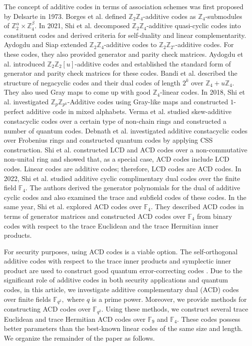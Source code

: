 \documentclass[sn-mathphys-num]{sn-jnl}%
\theoremstyle{thmstyleone}%
\theoremstyle{thmstyletwo}%
\theoremstyle{thmstylethree}%
\begin{document}
The concept of additive codes in terms of association schemes was first proposed by Delsarte \cite{fadditive,additivebook} in 1973. Borges et al. \cite{z2z4}
defined $\mathbb{Z}_2\mathbb{Z}_4$-additive codes as $\mathbb{Z}_4$-submodules of $\mathbb{Z}_2^{\alpha}\times \mathbb{Z}_4^{\beta}.$  In 2021, Shi et al. \cite{shi2021}  decomposed $\mathbb{Z}_2\mathbb{Z}_4$-additive quasi-cyclic codes   into constituent codes and derived criteria for self-duality and linear complementarity. Aydogdu and Siap \cite{z2z2sac} extended  $\mathbb{Z}_2\mathbb{Z}_4$-additive codes to $\mathbb{Z}_2 \mathbb{Z}_{2^s}$-additive codes. For these codes, they also provided generator and parity check matrices. Aydogdu et al. \cite{z2z2u} introduced $\mathbb{Z}_2\mathbb{Z}_2[u]$-additive codes and established the standard form of generator  and parity check matrices for these codes. Bandi et al. \cite{bandi2017} described the structure of negacyclic codes and their dual codes of length $2^k$ over $\mathbb{Z}_4+u\mathbb{Z}_4.$ They also used Gray maps to come up with good $\mathbb{Z}_4$-linear codes. In 2018, Shi et al. \cite{shi2018} investigated $\mathbb{Z}_p\mathbb{Z}_{p^k} $-Additive codes using Gray-like maps and constructed $1$-perfect additive code in mixed alphabets. Verma et al. \cite{omadd} studied skew-additive constacyclic codes over a certain type of non-chain rings and constructed a number of quantum codes.
Debnath et al. \cite{omadd2} investigated additive constacyclic codes over Frobenius rings and constructed quantum codes by applying CSS construction. Shi et al. \cite{lcdacdunital} constructed LCD and ACD codes over a non-commutative non-unital ring and showed that, as a special case, ACD codes include LCD codes. Linear codes are additive codes; therefore, LCD codes are ACD codes. In 2022, Shi et al. \cite{acf4} studied additive cyclic complimentary dual codes over the finite field $\mathbb{F}_4.$ The authors derived the generator polynomials for the dual of additive cyclic codes and also examined the trace and subfield codes of these codes. In the same year, Shi et al. \cite{af4} explored ACD codes over $\mathbb{F}_4.$ They described ACD codes in terms of generator matrices and constructed ACD codes over $\mathbb{F}_4$ from binary codes with respect to the trace Euclidean and the trace Hermitian inner products.

For security purposes, using ACD codes is a viable option. The self-orthogonal additive codes with respect to the trace inner products and symplectic inner product are used to construct good quantum error-correcting codes \cite{ketkar2006,calderbank1998}. Due to the significant role of additive codes  in both security applications and quantum codes, in this article, we investigate additive complementary dual (ACD) codes over finite fields $\mathbb{F}_{q^2},$ where $q$ is a prime power. Moreover, we provide methods for constructing ACD codes over $\mathbb{F}_{q^2}.$ Using these methods, we construct several trace Euclidean and trace Hermitian ACD codes over $\mathbb{F}_9$ and $\mathbb{F}_4.$ These codes possess better parameters than the best-known linear codes of the same size and length. We organize the remainder of the paper as follows.
\end{document}
